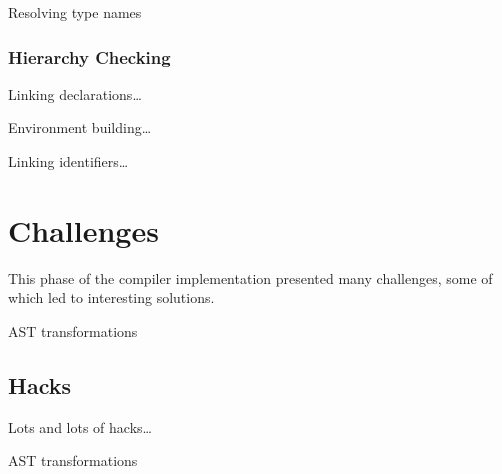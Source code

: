 \documentclass[pdftex,11pt,a4paper]{article}
\begin{document}
Resolving type names




\subsubsection{Hierarchy Checking}

Linking declarations\ldots

Environment building\ldots


Linking identifiers\ldots



\section{Challenges}

This phase of the compiler implementation presented many
challenges, some of which led to interesting solutions.

AST transformations


\subsection{Hacks}

Lots and lots of hacks\ldots

AST transformations
\end{document}

